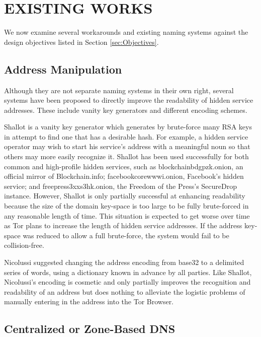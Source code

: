 
\chapter{EXISTING WORKS}
\label{ch:ExistingWorks}

\vspace{12pt}

We now examine several workarounds and existing naming systems against the design objectives listed in Section \ref{sec:Objectives}.

\section{Address Manipulation}

Although they are not separate naming systems in their own right, several systems have been proposed to directly improve the readability of hidden service addresses. These include vanity key generators and different encoding schemes.

Shallot is a vanity key generator which generates by brute-force many RSA keys in attempt to find one that has a desirable hash\cite{KatmagicShallot}. For example, a hidden service operator may wish to start his service's address with a meaningful noun so that others may more easily recognize it. Shallot has been used successfully for both common and high-profile hidden services, such as blockchainbdgpzk.onion, an official mirror of Blockchain.info; facebookcorewwwi.onion, Facebook's hidden service; and  freepress3xxs3hk.onion, the Freedom of the Press's SecureDrop instance. However, Shallot is only partially successful at enhancing readability because the size of the domain key-space is too large to be fully brute-forced in any reasonable length of time\cite{KatmagicShallot}. This situation is expected to get worse over time as Tor plans to increase the length of hidden service addresses\cite{Proposal224}. If the address key-space was reduced to allow a full brute-force, the system would fail to be collision-free.

Nicolussi suggested changing the address encoding from base32 to a delimited series of words, using a dictionary known in advance by all parties\cite{nicolussi2011human}. Like Shallot, Nicolussi's encoding is cosmetic and only partially improves the recognition and readability of an address but does nothing to alleviate the logistic problems of manually entering in the address into the Tor Browser.

\section{Centralized or Zone-Based DNS}

